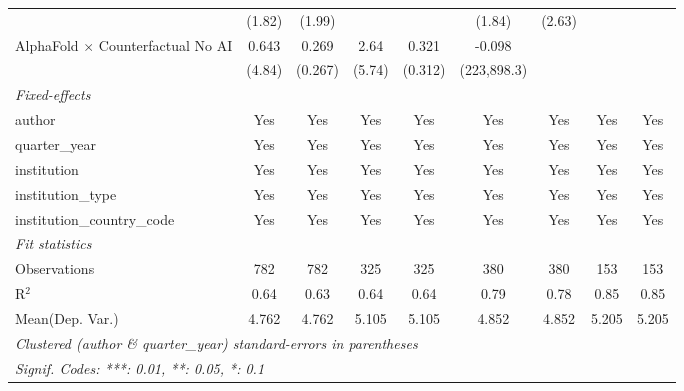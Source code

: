 \begin{tabular}{lcccccccc}
                                            & (1.82) & (1.99)  &        &         & (1.84)      & (2.63)     &        &   \\   
   AlphaFold $\times$ Counterfactual No AI  & 0.643  & 0.269   & 2.64   & 0.321   & -0.098      &            &        &   \\   
                                            & (4.84) & (0.267) & (5.74) & (0.312) & (223,898.3) &            &        &   \\   
   \midrule
   \emph{Fixed-effects}\\
   author                                   & Yes    & Yes     & Yes    & Yes     & Yes         & Yes        & Yes    & Yes\\  
   quarter\_year                            & Yes    & Yes     & Yes    & Yes     & Yes         & Yes        & Yes    & Yes\\  
   institution                              & Yes    & Yes     & Yes    & Yes     & Yes         & Yes        & Yes    & Yes\\  
   institution\_type                        & Yes    & Yes     & Yes    & Yes     & Yes         & Yes        & Yes    & Yes\\  
   institution\_country\_code               & Yes    & Yes     & Yes    & Yes     & Yes         & Yes        & Yes    & Yes\\  
   \midrule
   \emph{Fit statistics}\\
   Observations                             & 782    & 782     & 325    & 325     & 380         & 380        & 153    & 153\\  
   R$^2$                                    & 0.64   & 0.63    & 0.64   & 0.64    & 0.79        & 0.78       & 0.85   & 0.85\\  
Mean(Dep. Var.) & 4.762 & 4.762 & 5.105 & 5.105 & 4.852 & 4.852 & 5.205 & 5.205 \\
   \midrule \midrule
   \multicolumn{9}{l}{\emph{Clustered (author \& quarter\_year) standard-errors in parentheses}}\\
   \multicolumn{9}{l}{\emph{Signif. Codes: ***: 0.01, **: 0.05, *: 0.1}}\\
\end{tabular}
\par\endgroup
